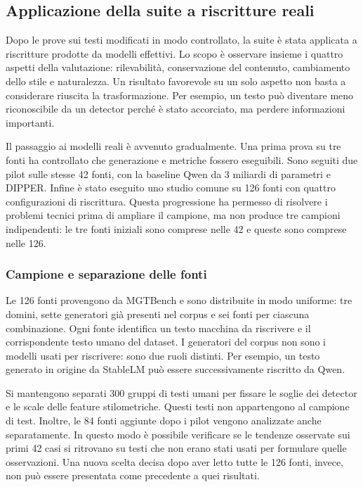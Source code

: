 \subsection{Applicazione della suite a riscritture reali}\label{applicazione-della-suite-a-riscritture-reali}

Dopo le prove sui testi modificati in modo controllato, la suite è stata applicata a riscritture prodotte da modelli effettivi. Lo scopo è osservare insieme i quattro aspetti della valutazione: rilevabilità, conservazione del contenuto, cambiamento dello stile e naturalezza. Un risultato favorevole su un solo aspetto non basta a considerare riuscita la trasformazione. Per esempio, un testo può diventare meno riconoscibile da un detector perché è stato accorciato, ma perdere informazioni importanti.

Il passaggio ai modelli reali è avvenuto gradualmente. Una prima prova su tre fonti ha controllato che generazione e metriche fossero eseguibili. Sono seguiti due pilot sulle stesse 42 fonti, con la baseline Qwen da 3 miliardi di parametri e DIPPER. Infine è stato eseguito uno studio comune su 126 fonti con quattro configurazioni di riscrittura. Questa progressione ha permesso di risolvere i problemi tecnici prima di ampliare il campione, ma non produce tre campioni indipendenti: le tre fonti iniziali sono comprese nelle 42 e queste sono comprese nelle 126.

\subsubsection{Campione e separazione delle fonti}\label{campione-e-separazione-delle-fonti}

Le 126 fonti provengono da MGTBench e sono distribuite in modo uniforme: tre domini, sette generatori già presenti nel corpus e sei fonti per ciascuna combinazione. Ogni fonte identifica un testo macchina da riscrivere e il corrispondente testo umano del dataset. I generatori del corpus non sono i modelli usati per riscrivere: sono due ruoli distinti. Per esempio, un testo generato in origine da StableLM può essere successivamente riscritto da Qwen.

Si mantengono separati 300 gruppi di testi umani per fissare le soglie dei detector e le scale delle feature stilometriche. Questi testi non appartengono al campione di test. Inoltre, le 84 fonti aggiunte dopo i pilot vengono analizzate anche separatamente. In questo modo è possibile verificare se le tendenze osservate sui primi 42 casi si ritrovano su testi che non erano stati usati per formulare quelle osservazioni. Una nuova scelta decisa dopo aver letto tutte le 126 fonti, invece, non può essere presentata come precedente a quei risultati.

